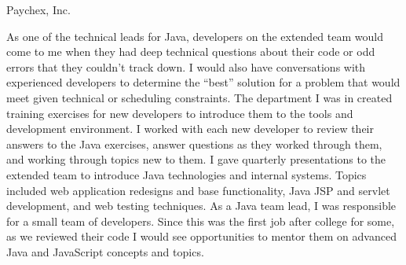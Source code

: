 \documentclass[letterpaper,MMMMyyyy,nonstopmode]{simpleresumecv}
\begin{document}
\begin{Body}
Paychex, Inc.
\begin{Detail}
\BulletItem
As one of the technical leads for Java, developers on the extended team would come to me when they had deep technical questions about their code or odd errors that they couldn't track down. I would also have conversations with experienced developers to determine the ``best'' solution for a problem that would meet given technical or scheduling constraints.
\BulletItem
The department I was in created training exercises for new developers to introduce them to the tools and development environment. I worked with each new developer to review their answers to the Java exercises,  answer questions as they worked through them, and working through topics new to them.
\BulletItem
I gave quarterly presentations to the extended team to introduce Java technologies and internal systems. Topics included web application redesigns and base functionality, Java JSP and servlet development, and web testing techniques.
\BulletItem
As a Java team lead, I was responsible for a small team of developers. Since this was the first job after college for some, as we reviewed their code I would see opportunities to mentor them on advanced Java and JavaScript concepts and topics.
\end{Detail}
\fi      %

\fi %

\iffalse %

\Section
{Awards}
{Awards}
{PDF:Awards}
\textbf{Paychex Paragon Award for Resiliency}
\hfill
\DatestampY{2019}
\begin{Detail}
Our project, "Adaptive Load Balancing", was chosen for this annual award. 
It routes requests in F5 BigIP GTM and LTMs across servers and data centers based on server load, real-time statistics, and other measures to reduce outages and improve response times for services.
\end{Detail}
\BigGap

\textbf{AppDynamics Scale Award}
\hfill
\DatestampY{2015}

Awarded for successfully deploying AppDynamics to over 20,000 JBoss, WebLogic, and Windows IIS servers across our fleet in our first year.
\fi %


\end{Body}
\end{document}
